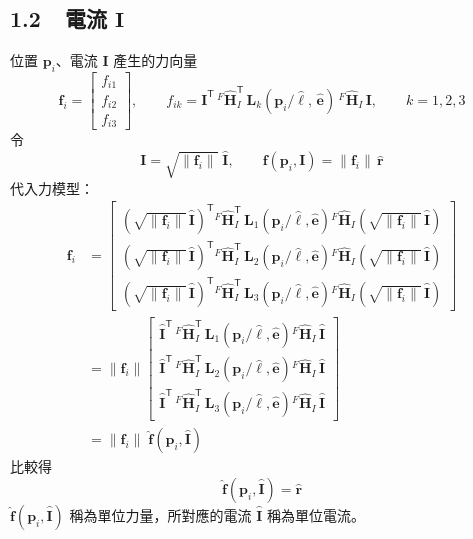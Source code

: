 \documentclass[11pt]{article}
\newcommand{\rh}{\hat{\mathbf{r}}}
\newcommand{\Ij}{\mathbf{I}}
\newcommand{\Ijh}{\hat{\mathbf{I}}}
\newcommand{\fij}{\mathbf{f}_{i}}
\begin{document}
\subsection*{1.2\ \ 電流 $\Ij$}

位置 $\mathbf{p}_i$、電流 $\Ij$ 產生的力向量
\[
\fij=\begin{bmatrix} f_{i1}\\ f_{i2}\\ f_{i3} \end{bmatrix},\qquad
f_{ik}=\Ij^{\mathsf T}\,{}^{F}\hat{\mathbf{H}}_{I}^{\mathsf T}\,
\mathbf{L}_k\!\left(\mathbf{p}_i/\hat{\ell},\,\hat{\mathbf{e}}\right)\,{}^{F}\hat{\mathbf{H}}_{I}\,\Ij,
\qquad k=1,2,3
\]
令
\[
\Ij=\sqrt{\|\fij\|}\;\Ijh,\qquad
\mathbf{f}\!\left(\mathbf{p}_i,\Ij\right)=\|\fij\|\,\rh
\]
代入力模型：
\[
\begin{aligned}
\fij
&=\begin{bmatrix}
\left(\sqrt{\|\fij\|}\,\Ijh\right)^{\!\mathsf T}{}^{F}\hat{\mathbf{H}}_{I}^{\mathsf T}\,\mathbf{L}_1\!\left(\mathbf{p}_i/\hat{\ell},\hat{\mathbf{e}}\right){}^{F}\hat{\mathbf{H}}_{I}\left(\sqrt{\|\fij\|}\,\Ijh\right)\\[2pt]
\left(\sqrt{\|\fij\|}\,\Ijh\right)^{\!\mathsf T}{}^{F}\hat{\mathbf{H}}_{I}^{\mathsf T}\,\mathbf{L}_2\!\left(\mathbf{p}_i/\hat{\ell},\hat{\mathbf{e}}\right){}^{F}\hat{\mathbf{H}}_{I}\left(\sqrt{\|\fij\|}\,\Ijh\right)\\[2pt]
\left(\sqrt{\|\fij\|}\,\Ijh\right)^{\!\mathsf T}{}^{F}\hat{\mathbf{H}}_{I}^{\mathsf T}\,\mathbf{L}_3\!\left(\mathbf{p}_i/\hat{\ell},\hat{\mathbf{e}}\right){}^{F}\hat{\mathbf{H}}_{I}\left(\sqrt{\|\fij\|}\,\Ijh\right)
\end{bmatrix}\\[6pt]
&=\|\fij\|
\begin{bmatrix}
\Ijh^{\mathsf T}\,{}^{F}\hat{\mathbf{H}}_{I}^{\mathsf T}\,\mathbf{L}_1\!\left(\mathbf{p}_i/\hat{\ell},\hat{\mathbf{e}}\right){}^{F}\hat{\mathbf{H}}_{I}\,\Ijh\\[2pt]
\Ijh^{\mathsf T}\,{}^{F}\hat{\mathbf{H}}_{I}^{\mathsf T}\,\mathbf{L}_2\!\left(\mathbf{p}_i/\hat{\ell},\hat{\mathbf{e}}\right){}^{F}\hat{\mathbf{H}}_{I}\,\Ijh\\[2pt]
\Ijh^{\mathsf T}\,{}^{F}\hat{\mathbf{H}}_{I}^{\mathsf T}\,\mathbf{L}_3\!\left(\mathbf{p}_i/\hat{\ell},\hat{\mathbf{e}}\right){}^{F}\hat{\mathbf{H}}_{I}\,\Ijh
\end{bmatrix}\\[6pt]
&=\|\fij\|\;\hat{\mathbf{f}}\!\left(\mathbf{p}_i,\Ijh\right)
\end{aligned}
\]
比較得
\[
\hat{\mathbf{f}}\!\left(\mathbf{p}_i,\Ijh\right)=\rh
\]
$\hat{\mathbf{f}}(\mathbf{p}_i,\Ijh)$ 稱為單位力量，所對應的電流 $\Ijh$ 稱為單位電流。
\end{document}
